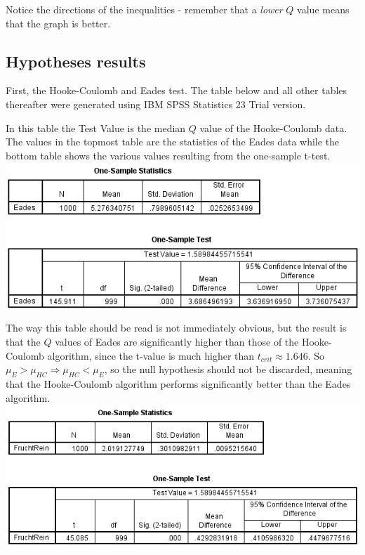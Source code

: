\documentclass[a4paper,12pt]{article}
\begin{document}
  Notice the directions of the inequalities - remember that a \emph{lower} $Q$ value means that the graph is better.
  
  \subsection{Hypotheses results}
  First, the Hooke-Coulomb and Eades test. The table below and all other tables thereafter were generated using IBM SPSS Statistics 23 Trial version.
  
  In this table the Test Value is the median $Q$ value of the Hooke-Coulomb data. The values in the topmost table are the statistics of the Eades data while the bottom table shows the various values resulting from the one-sample t-test. \\
  \includegraphics{HookeEadesTest}
  
  The way this table should be read is not immediately obvious, but the result is that the $Q$ values of Eades are significantly higher than those of the Hooke-Coulomb algorithm, since the t-value is much higher than $t_{crit} \approx 1.646$. So $\mu_{E} > \mu_{HC} \Rightarrow \mu_{HC} < \mu_{E}$, so the null hypothesis should not be discarded, meaning that the Hooke-Coulomb algorithm performs significantly better than the Eades algorithm. \\
  \includegraphics{HookeFRTest}
  
\end{document}

